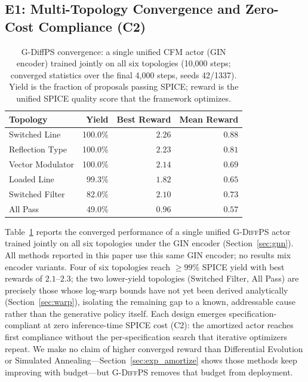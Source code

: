 \documentclass[sigconf,anonymous,review]{acmart}
\newcommand{\gdiffps}{\textsc{G-DiffPS}}
\begin{document}
\subsection{E1: Multi-Topology Convergence and Zero-Cost Compliance (C2)}
\label{sec:exp_conv}

\begin{table}[t]
  \caption{G-DiffPS convergence: a single unified CFM actor (GIN encoder)
           trained jointly on all six topologies (10,000 steps; converged
           statistics over the final 4{,}000 steps, seeds 42/1337).  Yield is
           the fraction of proposals passing SPICE; reward is the unified
           SPICE quality score that the framework optimizes.}
  \label{tab:main}
  \centering\small
  \begin{tabular}{lrrr}
    \toprule
    Topology & Yield & Best Reward & Mean Reward \\
    \midrule
    Switched Line    & 100.0\% & $2.26$ & $0.88$ \\
    Reflection Type  & 100.0\% & $2.23$ & $0.81$ \\
    Vector Modulator & 100.0\% & $2.14$ & $0.69$ \\
    Loaded Line      & 99.3\%  & $1.82$ & $0.65$ \\
    Switched Filter  & 82.0\%  & $2.10$ & $0.73$ \\
    All Pass         & 49.0\%  & $0.96$ & $0.57$ \\
    \bottomrule
  \end{tabular}
\end{table}

Table~\ref{tab:main} reports the converged performance of a single unified
\gdiffps{} actor trained jointly on all six topologies under the GIN encoder
(Section~\ref{sec:gnn}).  All methods reported in this paper use this same
GIN encoder; no results mix encoder variants.  Four of six topologies reach
$\geq 99\%$ SPICE yield with best rewards of $2.1$--$2.3$; the two lower-yield
topologies (Switched Filter, All Pass) are precisely those whose log-warp
bounds have not yet been derived analytically (Section~\ref{sec:warp}),
isolating the remaining gap to a known, addressable cause rather than the
generative policy itself.  Each design emerges specification-compliant at
zero inference-time SPICE cost (C2): the amortized actor reaches first
compliance without the per-specification search that iterative optimizers
repeat. We make no claim of higher converged reward than Differential
Evolution or Simulated Annealing---Section~\ref{sec:exp_amortize} shows those
methods keep improving with budget---but \gdiffps{} removes that budget from
deployment.
\end{document}

